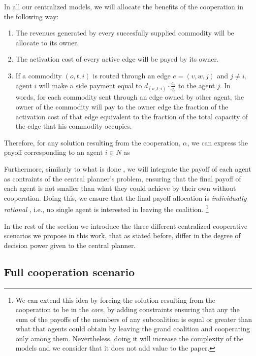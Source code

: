 \documentclass[review]{elsarticle}
\begin{document}
In all our centralized models, we will allocate the benefits of the cooperation
in the following way:
\begin{enumerate}
    \item The revenues generated by every succesfully supplied commodity will be
    allocate to its owner.
    \item The activation cost of every active edge will be payed by its owner.
    \item If a commodity $(o,t,i)$ is routed through an edge $e=(v,w,j)$ and
    $j\not = i$, agent $i$ will make a side payment equal to $d_{(o,t,i)} \cdot
    \frac{c_e}{q_e}$ to the agent $j$. In words, for each commodity sent through
    an edge owned by other agent, the owner of the commodity will pay to the
    owner edge the fraction of the activation cost of that edge equivalent to
    the fraction of the total capacity of the edge that his commodity occupies.
\end{enumerate}

Therefore, for any solution resulting from the cooperation, $\alpha$, we can express the
payoff corresponding to an agent $i\in N$ as


Furthermore, similarly to what is done \cite{VANOVERMEIRE2014125}, we will
integrate the payoff of each agent as contraints of the central planner's
problem, ensuring that the final payoff of each agent is not smaller than what
they could achieve by their own without cooperation. Doing this, we ensure that
the final payoff allocation is \emph{individually rational} \cite{GONZALEZ2010},
i.e., no single agent is interested in leaving the coalition. 
\footnote{We can extend this idea by forcing the solution resulting from the
cooperation to be in the \emph{core}, by adding constraints ensuring that any
the sum of the payoffs of the members of any subcoalition is equal or greater
than what that agents could obtain by leaving the grand coalition and
cooperating only among them. Nevertheless, doing it will increase the complexity
of the models and we consider that it does not add value to the paper.}

In the rest of the section we introduce the three different centralized
cooperative scenarios we propose in this work, that as stated before, differ in the
degree of decision power given to the central planner.


\subsection{Full cooperation scenario}
\end{document}
